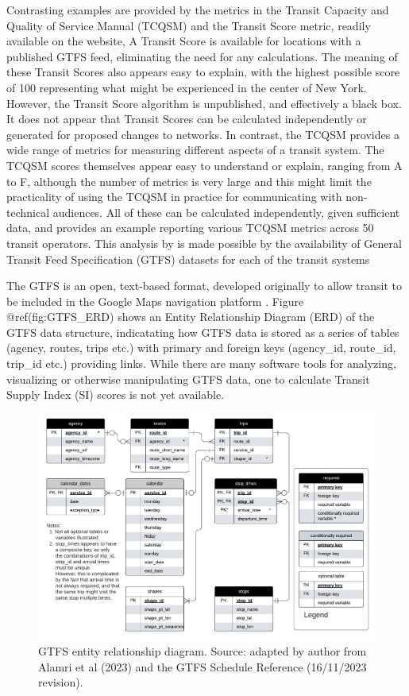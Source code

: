 \documentclass[preprint, 3p,
authoryear]{elsarticle} %
\begin{document}
Contrasting examples are provided by the metrics in the Transit Capacity
and Quality of Service Manual (TCQSM) and the Transit Score metric,
readily available on the \citet{WalkScore:2023tg} website, A Transit
Score is available for locations with a published GTFS feed, eliminating
the need for any calculations. The meaning of these Transit Scores also
appears easy to explain, with the highest possible score of 100
representing what might be experienced in the center of New York.
However, the Transit Score algorithm is unpublished, and effectively a
black box. It does not appear that Transit Scores can be calculated
independently or generated for proposed changes to networks. In
contrast, the TCQSM provides a wide range of metrics for measuring
different aspects of a transit system. The TCQSM scores themselves
appear easy to understand or explain, ranging from A to F, although the
number of metrics is very large and this might limit the practicality of
using the TCQSM in practice for communicating with non-technical
audiences. All of these can be calculated independently, given
sufficient data, and \citet{Wong:2013aa} provides an example reporting
various TCQSM metrics across 50 transit operators. This analysis by
\citet{Wong:2013aa} is made possible by the availability of General
Transit Feed Specification (GTFS) datasets for each of the transit
systems

The GTFS is an open, text-based format, developed originally to allow
transit to be included in the Google Maps navigation platform
\citep{GTFS}. Figure @ref(fig:GTFS\_ERD) shows an Entity Relationship
Diagram (ERD) of the GTFS data structure, indicatating how GTFS data is
stored as a series of tables (agency, routes, trips etc.) with primary
and foreign keys (agency\_id, route\_id, trip\_id etc.) providing links.
While there are many software tools for analyzing, visualizing or
otherwise manipulating GTFS data, one to calculate Transit Supply Index
(SI) scores is not yet available.

\begin{figure}
\includegraphics[width=1\linewidth]{graphics/GTFS} \caption{GTFS entity relationship diagram. Source: adapted by author from Alamri et al (2023) and the GTFS Schedule Reference (16/11/2023 revision).}\label{fig:GTFS_ERD}
\end{figure}
\end{document}
